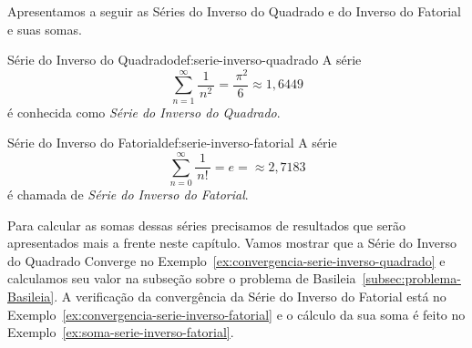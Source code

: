 Apresentamos a seguir as Séries do Inverso do Quadrado e do Inverso do Fatorial
e suas somas.

\begin{definicao}{Série do Inverso do Quadrado}{def:serie-inverso-quadrado}
	A série
  \[
    \sum_{n=1}^\infty \frac{1}{\,n^2\,} = \frac{\,\pi^2}{6} \approx 1,6449
  \]
  é conhecida como \emph{Série do Inverso do Quadrado}.
\end{definicao}

\begin{definicao}{Série do Inverso do Fatorial}{def:serie-inverso-fatorial}
	A série
  \[
   \sum_{n=0}^\infty \frac{1}{\,n!\,} = e = \approx 2,7183
  \]
	é chamada de \emph{Série do Inverso do Fatorial}.
\end{definicao}

Para calcular as somas dessas séries precisamos de resultados que serão
apresentados mais a frente neste capítulo.
Vamos mostrar que a Série do Inverso do Quadrado Converge no
Exemplo~\ref{ex:convergencia-serie-inverso-quadrado}
e calculamos seu valor na subseção sobre o problema de
Basileia~\ref{subsec:problema-Basileia}.
A verificação da convergência da Série do Inverso do Fatorial
está no Exemplo~\ref{ex:convergencia-serie-inverso-fatorial}
e o cálculo da sua soma é feito no
Exemplo~\ref{ex:soma-serie-inverso-fatorial}.

